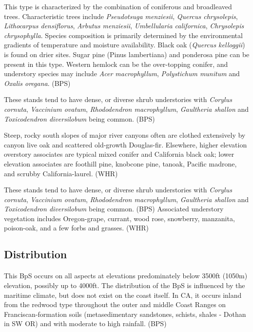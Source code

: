\documentclass{article}
\begin{document}
This type is characterized by the combination of coniferous and broadleaved trees. Characteristic trees include \emph{Pseudotsuga menziesii}, \emph{Quercus chrysolepis}, \emph{Lithocarpus densiflorus}, \emph{Arbutus menziesii}, \emph{Umbellularia californica}, \emph{Chrysolepis chrysophylla}. Species composition is primarily determined by the environmental gradients of temperature and moisture availability. Black oak (\emph{Quercus kelloggii}) is found on drier sites. Sugar pine (Pinus lambertiana) and ponderosa pine can be present in this type. Western hemlock can be the over-topping conifer, and understory species may include \emph{Acer macrophyllum}, \emph{Polystichum munitum} and \emph{Oxalis oregana}. (BPS)

These stands tend to have dense, or diverse shrub understories with \emph{Corylus cornuta}, \emph{Vaccinium ovatum}, \emph{Rhododendron macrophyllum}, \emph{Gaultheria shallon} and \emph{Toxicodendron diversilobum} being common. (BPS)

Steep, rocky south slopes of major river canyons often are clothed extensively by canyon live oak and scattered old-growth Douglas-fir. Elsewhere, higher elevation overstory associates are typical mixed conifer and California black oak; lower elevation associates are foothill pine, knobcone pine, tanoak, Pacific madrone, and scrubby California-laurel. (WHR)

These stands tend to have dense, or diverse shrub understories with \emph{Corylus cornuta}, \emph{Vaccinium ovatum}, \emph{Rhododendron macrophyllum}, \emph{Gaultheria shallon} and \emph{Toxicodendron diversilobum} being common. (BPS) Associated understory vegetation includes Oregon-grape, currant, wood rose, snowberry, manzanita, poison-oak, and a few forbs and grasses. (WHR)

\subsection*{Distribution}

\paragraph{} This BpS occurs on all aspects at elevations predominately below 3500ft (1050m) elevation, possibly up to 4000ft. The distribution of the BpS is influenced by the maritime climate, but does not exist on the coast itself. In CA, it occurs inland from the redwood type throughout the outer and middle Coast Ranges on Franciscan-formation soils (metasedimentary sandstones, schists, shales - Dothan in SW OR) and with moderate to high rainfall. (BPS)
\end{document}
